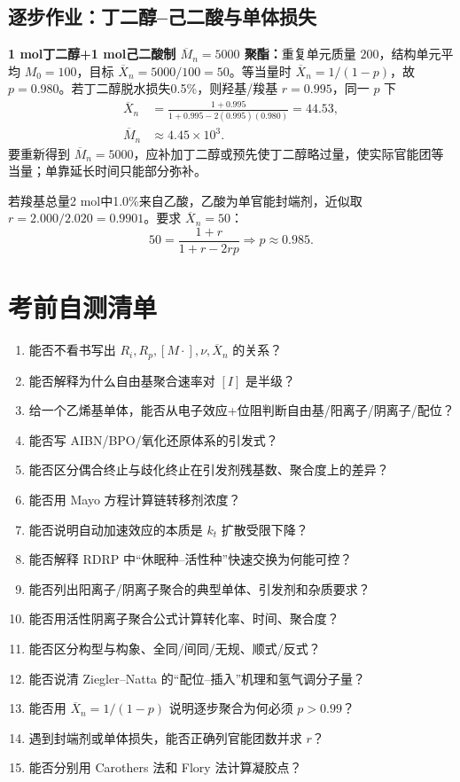 \documentclass[UTF8,a4paper,10pt,twocolumn]{ctexart}
\newcommand{\Mn}{\overline{M}_n}
\newcommand{\Xn}{\overline{X}_n}
\newcommand{\Rp}{R_p}
\newcommand{\Ri}{R_i}
\begin{document}
\subsection{逐步作业：丁二醇--己二酸与单体损失}
\begin{examplebox}
\textbf{1 mol丁二醇+1 mol己二酸制 $\Mn=5000$ 聚酯：}重复单元质量 $200$，结构单元平均 $M_0=100$，目标 $\Xn=5000/100=50$。等当量时 $\Xn=1/(1-p)$，故 $p=0.980$。若丁二醇脱水损失0.5\%，则羟基/羧基 $r=0.995$，同一 $p$ 下
\begin{align*}
\Xn&=\frac{1+0.995}{1+0.995-2(0.995)(0.980)}=44.53,\\
\Mn&\approx4.45\times10^3.
\end{align*}
要重新得到 $\Mn=5000$，应补加丁二醇或预先使丁二醇略过量，使实际官能团等当量；单靠延长时间只能部分弥补。

若羧基总量2 mol中1.0\%来自乙酸，乙酸为单官能封端剂，近似取 $r=2.000/2.020=0.9901$。要求 $\Xn=50$：
\[
50=\frac{1+r}{1+r-2rp}\Rightarrow p\approx0.985.
\]
\end{examplebox}

\section{考前自测清单}
\begin{enumerate}
  \item 能否不看书写出 $\Ri,\Rp,[M\cdot],\nu,\Xn$ 的关系？
  \item 能否解释为什么自由基聚合速率对 $[I]$ 是半级？
  \item 给一个乙烯基单体，能否从电子效应+位阻判断自由基/阳离子/阴离子/配位？
  \item 能否写 AIBN/BPO/氧化还原体系的引发式？
  \item 能否区分偶合终止与歧化终止在引发剂残基数、聚合度上的差异？
  \item 能否用 Mayo 方程计算链转移剂浓度？
  \item 能否说明自动加速效应的本质是 $k_t$ 扩散受限下降？
  \item 能否解释 RDRP 中“休眠种--活性种”快速交换为何能可控？
  \item 能否列出阳离子/阴离子聚合的典型单体、引发剂和杂质要求？
  \item 能否用活性阴离子聚合公式计算转化率、时间、聚合度？
  \item 能否区分构型与构象、全同/间同/无规、顺式/反式？
  \item 能否说清 Ziegler--Natta 的“配位--插入”机理和氢气调分子量？
  \item 能否用 $\Xn=1/(1-p)$ 说明逐步聚合为何必须 $p>0.99$？
  \item 遇到封端剂或单体损失，能否正确列官能团数并求 $r$？
  \item 能否分别用 Carothers 法和 Flory 法计算凝胶点？
\end{enumerate}
\end{document}
